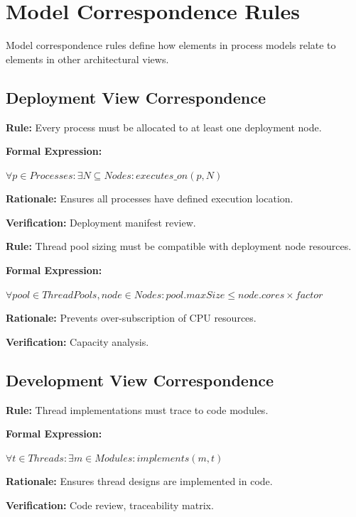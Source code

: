 \documentclass[11pt,letterpaper]{article}
\begin{document}
\section{Model Correspondence Rules}

Model correspondence rules define how elements in process models relate to elements in other architectural views.

\subsection{Deployment View Correspondence}

\begin{definitionbox}
\textbf{Rule:} Every process must be allocated to at least one deployment node.

\textbf{Formal Expression:}
\begin{center}
$\forall p \in Processes : \exists N \subseteq Nodes : executes\_on(p, N)$
\end{center}

\textbf{Rationale:} Ensures all processes have defined execution location.

\textbf{Verification:} Deployment manifest review.
\end{definitionbox}

\begin{definitionbox}
\textbf{Rule:} Thread pool sizing must be compatible with deployment node resources.

\textbf{Formal Expression:}
\begin{center}
$\forall pool \in ThreadPools, node \in Nodes : pool.maxSize \leq node.cores \times factor$
\end{center}

\textbf{Rationale:} Prevents over-subscription of CPU resources.

\textbf{Verification:} Capacity analysis.
\end{definitionbox}

\subsection{Development View Correspondence}

\begin{definitionbox}
\textbf{Rule:} Thread implementations must trace to code modules.

\textbf{Formal Expression:}
\begin{center}
$\forall t \in Threads : \exists m \in Modules : implements(m, t)$
\end{center}

\textbf{Rationale:} Ensures thread designs are implemented in code.

\textbf{Verification:} Code review, traceability matrix.
\end{definitionbox}
\end{document}
